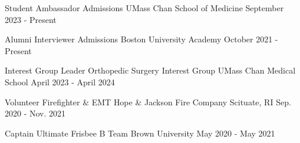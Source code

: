 
\begin{cventries}

  \cventry
  {Student Ambassador} %
  {Admissions} %
  {UMass Chan School of Medicine} %
  {September 2023 - Present} %
  {}

  \cventry
  {Alumni Interviewer} %
  {Admissions} %
  {Boston University Academy} %
  {October 2021 - Present} %
  {}

  \cventry
  {Interest Group Leader} %
  {Orthopedic Surgery Interest Group} %
  {UMass Chan Medical School} %
  {April 2023 - April 2024} %
  {}

  \cventry
  {Volunteer Firefighter \& EMT} %
  {Hope \& Jackson Fire Company} %
  {Scituate, RI} %
  {Sep. 2020 - Nov. 2021} %
  {}

  \cventry
  {Captain} %
  {Ultimate Frisbee B Team} %
  {Brown University} %
  {May 2020 - May 2021} %
  {}

\end{cventries}
